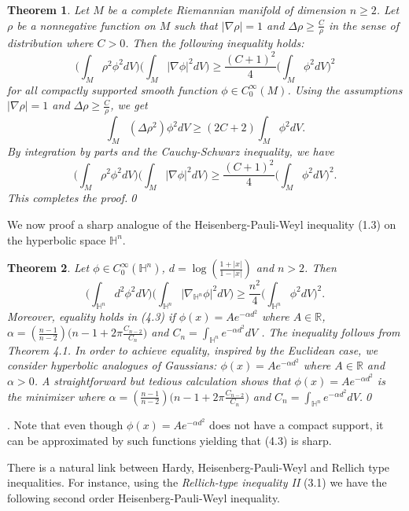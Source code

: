 \documentclass[12pt]{amsart}
\numberwithin{equation}{section}
\newtheorem{theorem}{Theorem}
\numberwithin{theorem}{section}
\numberwithin{theorem}{section} \numberwithin{lemma}{section}
\numberwithin{definition}{section}
\numberwithin{corollary}{section}
\numberwithin{remark}{section}
\numberwithin{proposition}{section}
\begin{document}
\begin{theorem}  Let $M$ be a complete  Riemannian manifold of dimension $n\ge2$. Let $\rho$ be a nonnegative function on $M$ such that
$|\nabla \rho|=1$ and $\Delta\rho\ge \frac{C}{\rho}$ in the sense
of distribution where $C>0$. Then the following inequality holds:
\begin{equation}
\Big(\int_M \rho^2\phi^2dV\Big)\Big(\int_M|\nabla \phi|^2dV\Big)\ge
\frac{(C+1)^2}{4}\Big(\int_M\phi^2 dV\Big)^2
\end{equation}
for all compactly supported smooth function $\phi\in
C_0^{\infty}(M)$. \proof Using the  assumptions $|\nabla \rho|=1$
and $\Delta\rho\ge \frac{C}{\rho}$, we get
\begin{equation}\int_M(\Delta\rho^2)\phi^2dV\ge
(2C+2)\int_M\phi^2dV. \end{equation} By integration by parts and the
Cauchy-Schwarz inequality, we have
\[\Big(\int_M
\rho^2\phi^2dV\Big)\Big(\int_M|\nabla \phi|^2dV\Big)\ge
\frac{(C+1)^2}{4}\Big(\int_M\phi^2 dV\Big)^2.\] This completes the
proof.\qed
\end{theorem}
We now proof a sharp analogue of the Heisenberg-Pauli-Weyl
inequality (1.3) on the hyperbolic space $\mathbb{H}^n$.
\begin{theorem} Let
$\phi\in C_0^{\infty}(\mathbb{H}^n)$, $d=\log(\frac{1+|x|}{1-|x|})$
and $n> 2$. Then
\begin{equation}
\Big(\int_{\mathbb{H}^n} d^2 \phi^2
dV\Big)\Big(\int_{\mathbb{H}^n}|\nabla_{\mathbb{H}^n}
\phi|^2dV\Big)\ge \frac{n^2}{4}\Big(\int_{\mathbb{H}^n}\phi^2
dV\Big)^2.
\end{equation}
Moreover, equality holds in (4.3) if $\phi(x)=Ae^{-\alpha d^2}$
where $A\in \mathbb{R}$, $\alpha=(\frac{n-1}{n-2})\big(n-1+2\pi
\frac{C_{n-2}}{C_n}\big)$ and $C_n=\int_{\mathbb{H}^n}e^{-\alpha
d^2}dV$ . \proof The inequality follows from Theorem 4.1. In order
to achieve equality, inspired by the Euclidean case, we consider
hyperbolic analogues of Gaussians: $\phi(x)=Ae^{-\alpha d^2}$ where
$A\in \mathbb{R}$ and $\alpha>0$. A straightforward but tedious
calculation shows that $\phi(x)=Ae^{-\alpha d^2}$ is the minimizer
where $\alpha=(\frac{n-1}{n-2})\big(n-1+2\pi
\frac{C_{n-2}}{C_n}\big)$ and  $C_n=\int_{\mathbb{H}^n}e^{-\alpha
d^2}dV$.\qed
\end{theorem}
. Note that even though $\phi(x)=Ae^{-\alpha d^2}$ does not have a compact support, it can be approximated by such functions yielding that (4.3) is sharp.
\medskip

There is a natural link between Hardy, Heisenberg-Pauli-Weyl and
Rellich type inequalities. For instance, using the
\textit{Rellich-type inequality II} (3.1) we have the following
second order Heisenberg-Pauli-Weyl inequality.
\end{document}
